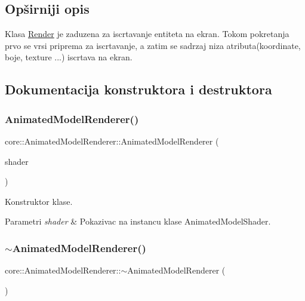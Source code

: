\subsection{Opširniji opis}
Klasa \hyperlink{classcore_1_1Render}{Render} je zaduzena za iscrtavanje entiteta na ekran. Tokom pokretanja prvo se vrsi priprema za iscrtavanje, a zatim se sadrzaj niza atributa(koordinate, boje, texture ...) iscrtava na ekran. 

\subsection{Dokumentacija konstruktora i destruktora}
\mbox{\label{classcore_1_1AnimatedModelRenderer_abb8518841908e242c3112ad872c5d8cb}} 
\subsubsection{\texorpdfstring{Animated\+Model\+Renderer()}{AnimatedModelRenderer()}}
{\footnotesize\ttfamily core\+::\+Animated\+Model\+Renderer\+::\+Animated\+Model\+Renderer (\begin{DoxyParamCaption}\item[{\hyperlink{classshader_1_1AnimatedModelShader}{Animated\+Model\+Shader} $\ast$}]{shader }\end{DoxyParamCaption})}



Konstruktor klase. 


\begin{DoxyParams}{Parametri}
{\em shader} & Pokazivac na instancu klase Animated\+Model\+Shader. \\
\hline
\end{DoxyParams}
\mbox{\label{classcore_1_1AnimatedModelRenderer_aa04751cf1a8d43e45859b56621017602}} 
\subsubsection{\texorpdfstring{$\sim$\+Animated\+Model\+Renderer()}{~AnimatedModelRenderer()}}
{\footnotesize\ttfamily core\+::\+Animated\+Model\+Renderer\+::$\sim$\+Animated\+Model\+Renderer (\begin{DoxyParamCaption}{ }\end{DoxyParamCaption})}




